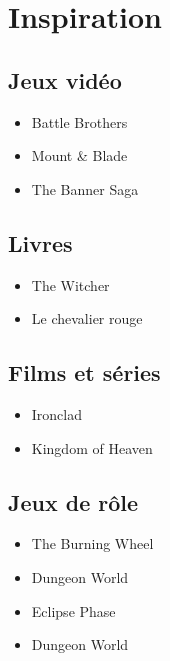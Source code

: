 \documentclass[10pt,a4paper,twocolumn]{book}
\begin{document}
\section*{Inspiration}
\subsection*{Jeux vidéo}
\begin{itemize}
\item Battle Brothers
\item Mount \& Blade
\item The Banner Saga
\end{itemize}
\subsection*{Livres}
\begin{itemize}
\item The Witcher
\item Le chevalier rouge
\end{itemize}
\subsection*{Films et séries}
\begin{itemize}
\item Ironclad
\item Kingdom of Heaven
\end{itemize}
\subsection*{Jeux de rôle}
\begin{itemize}
\item The Burning Wheel
\item Dungeon World
\item Eclipse Phase
\item Dungeon World
\end{itemize}
\tableofcontents
\end{document}
